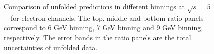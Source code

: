 \begin{figure}[h]
\centering
{}
\caption{Comparison of unfolded \ptw predictions in different binnings at $\sqrt{s} = 5$~\TeV\ for electron channels. The top, middle and bottom ratio panels correspond to 6 GeV binning, 7 GeV binning and 9 GeV binning, respectively. The error bands in the ratio panels are the total uncertainties of unfolded data.}\end{figure}
